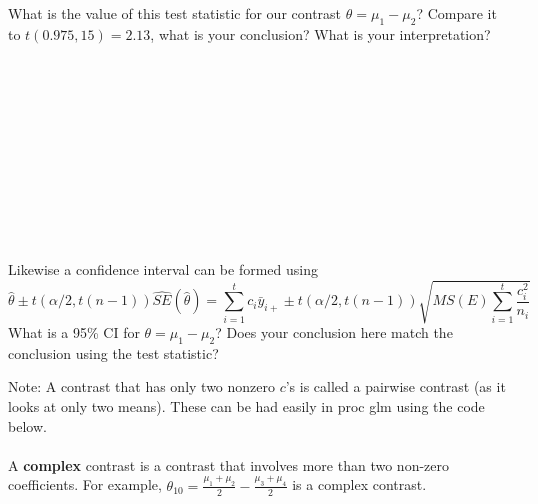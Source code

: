 What is the value of this test statistic for our contrast $\theta=\mu_1-\mu_2$?  Compare it to $t(0.975,15)=2.13$, what is your conclusion?  What is your interpretation?\\~\\~\\~\\~\\~\\~\\~\\~\\~\\~\\~\\

Likewise a confidence interval can be formed using
$$\hat{\theta}\pm t(\alpha/2,t(n-1))\hat{SE}(\hat{\theta}) = \sum_{i=1}^{t}c_{i}\bar{y}_{i+}\pm t(\alpha/2,t(n-1))\sqrt{MS(E)\sum_{i=1}^{t}\frac{c_{i}^2}{n_{i}}}$$
What is a 95\% CI for $\theta=\mu_1-\mu_2$?  Does your conclusion here match the conclusion using the test statistic?

\newpage

Note:  A contrast that has only two nonzero $c$'s is called a pairwise contrast (as it looks at only two means).  These can be had easily in proc glm using the code below.
\\~\\

A \textbf{complex} contrast is a contrast that involves more than two non-zero coefficients.  For example, $\theta_{10}=\frac{\mu_{1}+\mu_{2}}{2}-\frac{\mu_{3}+\mu_{4}}{2}$ is a complex contrast.  \\~\\

